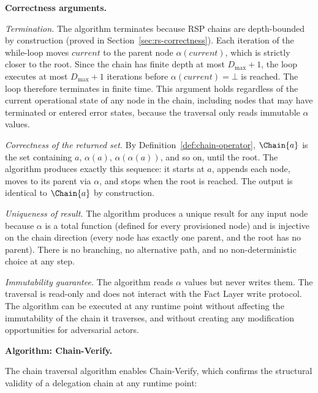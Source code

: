 \medskip
\noindent\textbf{Correctness arguments.}

\textit{Termination.} The algorithm terminates because RSP chains are depth-bounded by construction (proved in Section~\ref{sec:rs-correctness}). Each iteration of the while-loop moves $current$ to the parent node $\alpha(current)$, which is strictly closer to the root. Since the chain has finite depth at most $D_{\max} + 1$, the loop executes at most $D_{\max} + 1$ iterations before $\alpha(current) = \bot$ is reached. The loop therefore terminates in finite time. This argument holds regardless of the current operational state of any node in the chain, including nodes that may have terminated or entered error states, because the traversal only reads immutable $\alpha$ values.

\textit{Correctness of the returned set.} By Definition~\ref{def:chain-operator}, $\Chain{a}$ is the set containing $a$, $\alpha(a)$, $\alpha(\alpha(a))$, and so on, until the root. The algorithm produces exactly this sequence: it starts at $a$, appends each node, moves to its parent via $\alpha$, and stops when the root is reached. The output is identical to $\Chain{a}$ by construction.

\textit{Uniqueness of result.} The algorithm produces a unique result for any input node because $\alpha$ is a total function (defined for every provisioned node) and is injective on the chain direction (every node has exactly one parent, and the root has no parent). There is no branching, no alternative path, and no non-deterministic choice at any step.

\textit{Immutability guarantee.} The algorithm reads $\alpha$ values but never writes them. The traversal is read-only and does not interact with the Fact Layer write protocol. The algorithm can be executed at any runtime point without affecting the immutability of the chain it traverses, and without creating any modification opportunities for adversarial actors.

\medskip
\noindent\textbf{Algorithm: Chain-Verify.}

The chain traversal algorithm enables Chain-Verify, which confirms the structural validity of a delegation chain at any runtime point:


